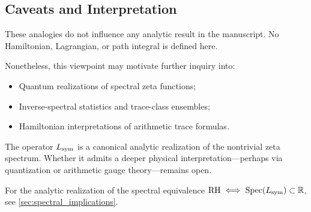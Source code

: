\subsection*{Caveats and Interpretation}

These analogies do not influence any analytic result in the manuscript. No Hamiltonian, Lagrangian, or path integral is defined here.

Nonetheless, this viewpoint may motivate further inquiry into:
\begin{itemize}
  \item Quantum realizations of spectral zeta functions;
  \item Inverse-spectral statistics and trace-class ensembles;
  \item Hamiltonian interpretations of arithmetic trace formulas.
\end{itemize}

\medskip
\noindent
The operator \( L_{\mathrm{sym}} \) is a canonical analytic realization of the nontrivial zeta spectrum. Whether it admits a deeper physical interpretation—perhaps via quantization or arithmetic gauge theory—remains open.

\medskip
\noindent
For the analytic realization of the spectral equivalence \( \mathrm{RH} \iff \operatorname{Spec}(L_{\mathrm{sym}}) \subset \mathbb{R} \), see \cref{sec:spectral_implications}.

